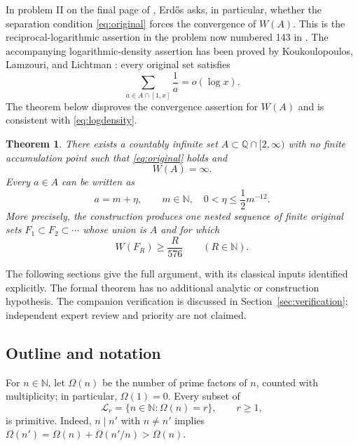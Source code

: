 \documentclass[11pt,reqno]{amsart}
\newtheorem{theorem}{Theorem}[section]
\theoremstyle{definition}
\theoremstyle{remark}
\numberwithin{equation}{section}
\newcommand{\N}{\mathbb N}
\newcommand{\Q}{\mathbb Q}
\newcommand{\Om}{\Omega}
\begin{document}
In problem II on the final page of \cite{Erdos1948}, Erd\H{o}s asks, in
particular, whether the separation condition \eqref{eq:original} forces
the convergence of $W(A)$. This is the reciprocal-logarithmic assertion in
the problem now numbered 143 in \cite{Bloom143}. The accompanying
logarithmic-density assertion has been proved by Koukoulopoulos,
Lamzouri, and Lichtman \cite[Theorem 1]{KLL2025}: every original set satisfies
\begin{equation}\label{eq:logdensity}
 \sum_{a\in A\cap[1,x]}\frac1a=o(\log x).
\end{equation}
The theorem below disproves the convergence assertion for $W(A)$ and is
consistent with
\eqref{eq:logdensity}.

\begin{theorem}\label{thm:main}
There exists a countably infinite set $A\subset\Q\cap[2,\infty)$ with
no finite accumulation point such that \eqref{eq:original} holds and
\begin{equation}\label{eq:divergence}
 W(A)=\infty.
\end{equation}
Every $a\in A$ can be written as
\begin{equation}\label{eq:near-integer}
 a=m+\eta,
 \qquad m\in\N,\quad 0<\eta\leq\frac12m^{-12}.
\end{equation}
More precisely, the construction produces one nested sequence of finite
original sets $F_1\subset F_2\subset\cdots$ whose union is $A$ and for which
\begin{equation}\label{eq:prefix-weight}
 W(F_R)\geq\frac{R}{576}\qquad(R\in\N).
\end{equation}
\end{theorem}

The following sections give the full argument, with its classical inputs
identified explicitly. The formal theorem has no additional analytic or
construction hypothesis. The companion verification is discussed in
Section~\ref{sec:verification}; independent expert review and priority
are not claimed.

\subsection{Outline and notation}
For $n\in\N$, let $\Om(n)$ be the number of prime factors of $n$, counted
with multiplicity; in particular, $\Om(1)=0$. Every subset of
\[
 \mathcal L_r=\{n\in\N:\Om(n)=r\},\qquad r\geq1,
\]
is primitive. Indeed, $n\mid n'$ with $n\ne n'$ implies
$\Om(n')=\Om(n)+\Om(n'/n)>\Om(n)$.
\end{document}
